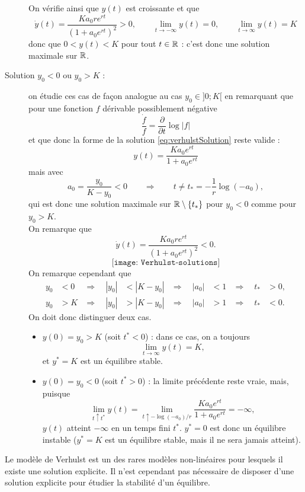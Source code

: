 \begin{description}
$$  $$
  On vérifie ainsi que $y(t)$ est croissante et que 
  $$
  \dot y(t) = \frac{Ka_0 r e^{rt}}{(1 + a_0 e^{rt})^2} > 0, 
  \qquad 
  \lim_{t \to -\infty} y(t) = 0, 
  \qquad
  \lim_{t \to \infty} y(t) = K
  $$
  donc que $0 < y(t) < K$ pour tout $t \in \mathbb{R}$ : c'est donc une solution maximale sur $\mathbb{R}$. 
  \item[Solution $y_0 < 0$ ou $y_0 > K$ :] on étudie ces cas de façon analogue au cas $y_0 \in ]0; K[$ en remarquant que pour une fonction $f$ dérivable possiblement négative 
  $$
  \frac{\dot f}{f} = \frac{\partial}{\partial t} \log |f|
  $$
  et que donc la forme de la solution \eqref{eq:verhulstSolution} reste valide : 
  $$
  y(t) = \frac{K a_0 e^{rt}}{1 +  a_0 e^{rt}}
  $$
  mais avec
  $$
  a_0 = \frac{y_0}{K-y_0} < 0
  \qquad \Rightarrow \qquad
  t \neq t_* = -\frac1r \log(-a_0),
  $$
  qui est donc une solution maximale sur $\mathbb{R} \setminus \left\{t_*\right\}$ pour $y_0 < 0$ comme pour $y_0 > K$. \\
  On remarque que
  $$
  \dot y(t) = \frac{K a_0 r e^{rt}}{(1 + a_0 e^{rt})^2}  < 0.
  $$
  $$
  \texttt{[image: Verhulst-solutions]}
  $$
  On remarque cependant que
  \begin{align*}
    y_0 & < 0 & \Rightarrow \quad |y_0| & < |K - y_0| & 
    \Rightarrow \quad |a_0| & < 1 & \Rightarrow \quad t_* & > 0, \\
    y_0 & > K & \Rightarrow \quad |y_0| & > |K - y_0| & 
    \Rightarrow \quad |a_0| & > 1 & \Rightarrow \quad t_* & < 0.
  \end{align*}
  On doit donc distinguer deux cas.
  \begin{itemize}
    \item $y(0) = y_0 > K$ (soit $t^* < 0$) : dans ce cas, on a toujours
    $$
    \lim_{t \to \infty} y(t) = K,
    $$
    et $y^* = K$ est un équilibre stable.
    \item $y(0) = y_0 < 0$ (soit $t^* > 0$) : la limite précédente reste vraie, mais, puisque
    $$
    \lim_{t \uparrow t^*} y(t) 
    = \lim_{t \uparrow -\log(-a_0) / r}  \frac{K a_0 e^{rt}}{1 +  a_0 e^{rt}}
    = -\infty,
    $$
    $y(t)$ atteint $- \infty$ en un temps fini $t^*$. $y^* = 0$ est donc un équilibre instable ($y^* = K$ est un équilibre stable, mais il ne sera jamais atteint).
  \end{itemize}
\end{description}

\remark
Le modèle de Verhulst est un des rares modèles non-linéaires pour lesquels il existe une solution explicite. Il n'est cependant pas nécessaire de disposer d'une solution explicite pour étudier la stabilité d'un équilibre.

